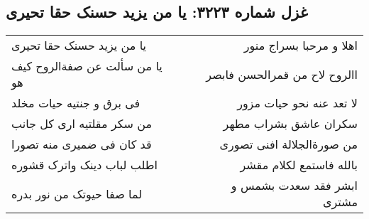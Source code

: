 \begin{center}
\section*{غزل شماره ۳۲۲۳: یا من یزید حسنک حقا تحیری}
\label{sec:3223}
\begin{longtable}{l p{0.5cm} r}
یا من یزید حسنک حقا تحیری
&&
اهلا و مرحبا بسراج منور
\\
یا من سألت عن صفةالروح کیف هو
&&
االروح لاح من قمرالحسن فابصر
\\
فی برق و جنتیه حیات مخلد
&&
لا تعد عنه نحو حیات مزور
\\
من سکر مقلتیه اری کل جانب
&&
سکران عاشق بشراب مطهر
\\
قد کان فی ضمیری منه تصورا
&&
من صورةالجلالة افنی تصوری
\\
اطلب لباب دینک واترک قشوره
&&
بالله فاستمع لکلام مقشر
\\
لما صفا حیوتک من نور بدره
&&
ابشر فقد سعدت بشمس و مشتری
\\
\end{longtable}
\end{center}
